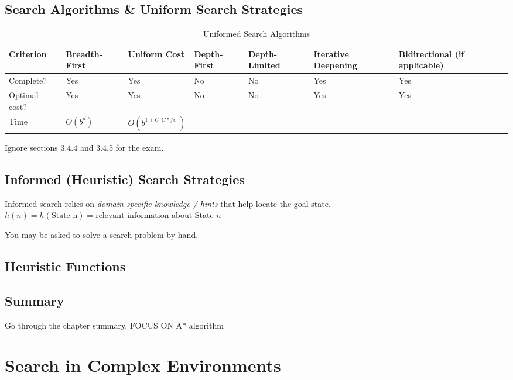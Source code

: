 \documentclass[exam={Midterm}]{cs581exam}
\begin{document}
\subsection{Search Algorithms \& Uniform Search Strategies}\label{subsec:3.3-4}
\begin{table}[H]
    \centering
    \begin{threeparttable}
		\caption{Uniformed Search Algorithms}
		\label{tab:uniformed-search-algorithms}
		\begin{tabular}{|l*{6}{P{0.04\textwidth}}|}
			\hline
			Criterion & Breadth-First & Uniform Cost & Depth-First & Depth-Limited & Iterative Deepening & Bidirectional (if applicable)\\
			\hline
			Complete? & Yes & Yes & No & No & Yes & Yes\\
			\hline
			Optimal cost? & Yes & Yes & No & No & Yes & Yes\\
			\hline
			Time & $O(b^{d})$ & $O(b^{1+C\lfloor C*/\epsilon\rfloor})$
		\end{tabular}
		\begin{tablenotes}
			\small
			\item
		\end{tablenotes}
	\end{threeparttable}
\end{table}

Ignore sections 3.4.4 and 3.4.5 for the exam.
\setcounter{subsection}{4}%
\subsection{Informed (Heuristic) Search Strategies}\label{subsec:3.5}
Informed search relies on \emph{domain-specific knowledge / hints} that help locate the goal state.
$h(n)=h(\mbox{State n})=\mbox{relevant information about State } n$

You may be asked to solve a search problem by hand.
\subsection{Heuristic Functions}\label{subsec:3.6}
\subsection{Summary}\label{subsec:3-summary}
Go through the chapter summary. FOCUS ON A* algorithm

\section{Search in Complex Environments}\label{sec:search-in-complex-environments}
\end{document}
